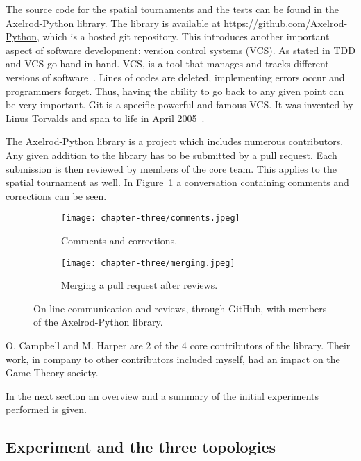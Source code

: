 The source code for the spatial tournaments and the tests can be found
in the Axelrod-Python library. The library is available at
\url{https://github.com/Axelrod-Python},
which is a hosted git repository. This introduces another important aspect
of software development: version control systems (VCS). As stated in \cite{Developer}
TDD and VCS go hand in hand. VCS, is a tool that manages and tracks different
versions of software~\cite{Vogel2014}. Lines of codes are deleted, implementing
errors occur and programmers forget. Thus, having the ability to go back to any
given point can be very important. Git is a specific powerful and famous VCS. It
was invented by Linus Torvalds and span to life in April 2005~\cite{Vogel2014}.

The Axelrod-Python library is a project which includes numerous contributors.
Any given addition to the
library has to be submitted by a pull request. Each submission is then
reviewed by members of the core team. This applies to the spatial tournament as well.
In Figure~\ref{fig:github} a conversation containing comments and corrections
can be seen.

\begin{figure}[H]
\centering
    \begin{subfigure}[H]{0.7\textwidth}
    \centering
        \texttt{[image: chapter-three/comments.jpeg]}
    \caption{Comments and corrections.}
    \end{subfigure}
\hfill
    \begin{subfigure}[H]{0.7\textwidth}\centering
    \centering
        \texttt{[image: chapter-three/merging.jpeg]}
    \caption{Merging a pull request after reviews.}
    \end{subfigure}
\caption{On line communication and reviews, through GitHub,
         with members of the Axelrod-Python library.}
\label{fig:github}
\end{figure}

O. Campbell and M. Harper are 2 of the 4 core contributors of the library.
Their work, in company to other contributors included myself, had an impact on
the Game Theory society.

In the next section an overview and a summary of the initial experiments
performed is given.


\subsection{Experiment and the three topologies}

